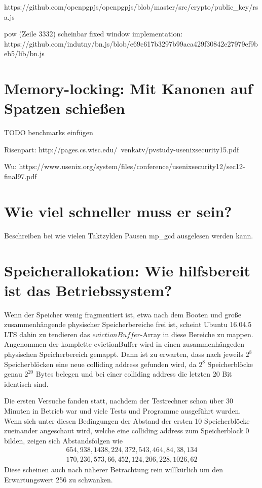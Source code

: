 https://github.com/openpgpjs/openpgpjs/blob/master/src/crypto/public_key/rsa.js

pow (Zeile 3332) scheinbar fixed window implementation:\\
https://github.com/indutny/bn.js/blob/e69c617b3297b99aca429f30842e27979ef9beb5/lib/bn.js

\section{Memory-locking: Mit Kanonen auf Spatzen schießen}

TODO benchmarks einfügen

Risenpart:
http://pages.cs.wisc.edu/~venkatv/pvstudy-usenixsecurity15.pdf
\cite{MemoryLockingRisenpart}

Wu:
https://www.usenix.org/system/files/conference/usenixsecurity12/sec12-final97.pdf
\cite{MemoryLockingWu}

\section{Wie viel schneller muss er sein?}

Beschreiben bei wie vielen Taktzyklen Pausen mp_gcd ausgelesen werden kann.

\section{Speicherallokation: Wie hilfsbereit ist das Betriebssystem?}

Wenn der Speicher wenig fragmentiert ist, etwa nach dem Booten und große zusammenhängende physischer Speicherbereiche frei ist, scheint Ubuntu 16.04.5 LTS dahin zu tendieren das $evictionBuffer$-Array in diese Bereiche zu mappen.
Angenommen der komplette evictionBuffer wird in einen zusammenhängeden physischen Speicherbereich gemappt. Dann ist zu erwarten, dass nach jeweils $2^8$ Speicherblöcken eine neue colliding address gefunden wird, da $2^8$ Speicherblöcke genau $2^20$ Bytes belegen und bei einer colliding address die letzten 20 Bit identisch sind.

Die ersten Versuche fanden statt, nachdem der Testrechner schon über 30 Minuten in Betrieb war und viele Tests und Programme ausgeführt wurden.
Wenn sich unter diesen Bedingungen der Abstand der ersten 10 Speicherblöcke zueinander angeschaut wird, welche eine colliding address zum Speicherblock 0 bilden, zeigen sich Abstandsfolgen wie 
\begin{align*} 
654, 938, 1438, 224, 372, 543, 464, 84, 38, 134\\
170, 236, 573, 66, 452, 124, 206, 228, 1026, 62
\end{align*}
Diese scheinen auch nach näherer Betrachtung rein willkürlich um den Erwartungswert 256 zu schwanken.

